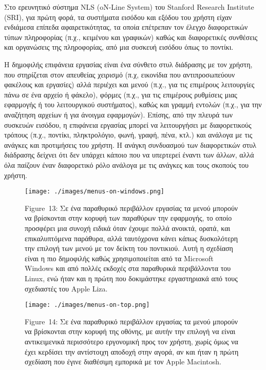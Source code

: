 \documentclass[
]{article}
\begin{document}
Στο ερευνητικό σύστημα NLS (oN-Line System) του Stanford Research
Institute (SRI), για πρώτη φορά, τα συστήματα εισόδου και εξόδου του
χρήστη είχαν ενδιάμεσα επίπεδα αφαιρετικότητας, τα οποία επέτρεπαν τον
έλεγχο διαφορετικών τύπων πληροφορίας (π.χ., κειμένου και γραφικών)
καθώς και διαφορετικές συνθέσεις και οργανώσεις της πληροφορίας, από μια
συσκευή εισόδου όπως το ποντίκι.

Η δημοφιλής επιφάνεια εργασίας είναι ένα σύνθετο στυλ διάδρασης με τον
χρήστη, που στηρίζεται στον απευθείας χειρισμό (π.χ, εικονίδια που
αντιπροσωπεύουν φακέλους και εργασίες) αλλά περιέχει και μενού (π.χ.,
για τις επιμέρους λειτουργίες πάνω σε ένα αρχείο ή φάκελο), φόρμες
(π.χ., για τις επιμέρους ρυθμίσεις μιας εφαρμογής ή του λειτουργικού
συστήματος), καθώς και γραμμή εντολών (π.χ., για την αναζήτηση αρχείων ή
για άνοιγμα εφαρμογών). Επίσης, από την πλευρά των συσκευών εισόδου, η
επιφάνεια εργασίας μπορεί να λειτουργήσει με διαφορετικούς τρόπους
(π.χ., ποντίκι, πληκτρολόγιο, φωνή, γραφή, πένα, κτλ.) και ανάλογα με
τις ανάγκες και προτιμήσεις του χρήστη. Η ανάγκη συνδυασμού των
διαφορετικών στυλ διάδρασης δείχνει ότι δεν υπάρχει κάποιο που να
υπερτερεί έναντι των άλλων, αλλά όλα παίζουν έναν διαφορετικό ρόλο
ανάλογα με τις ανάγκες και τους σκοπούς του χρήστη.

\leavevmode{}%
\begin{figure}
\hypertarget{fig:menus-on-windows}{%
\centering
\texttt{[image: ./images/menus-on-windows.png]}
\caption{Figure~13: Σε ένα παραθυρικό περιβάλλον εργασίας τα μενού
μπορούν να βρίσκονται στην κορυφή των παραθύρων την εφαρμογής, το οποίο
προσφέρει μια συνοχή ειδικά όταν έχουμε πολλά ανοικτά, ορατά, και
επικαλυπτόμενα παράθυρα, αλλά ταυτόχρονα κάνει κάπως δυσκολότερη την
επιλογή των μενού με τον δείκτη του ποντικιού. Αυτή η σχεδίαση είναι η
πιο δημοφιλής καθώς χρησιμοποιείται από τα Microsoft Windows και από
πολλές εκδοχές στα παραθυρικά περιβάλλοντα του Linux, ενώ ήταν και η
πρώτη που δοκιμάστηκε εργαστηριακά από τους σχεδιαστές του Apple
Liza.}\label{fig:menus-on-windows}
}
\end{figure}

\leavevmode{}%
\begin{figure}
\hypertarget{fig:menus-on-top}{%
\centering
\texttt{[image: ./images/menus-on-top.png]}
\caption{Figure~14: Σε ένα παραθυρικό περιβάλλον εργασίας τα μενού
μπορούν να βρίσκονται στην κορυφή της οθόνης, με αυτήν την επιλογή να
είναι αντικειμενικά περισσότερο εργονομική προς τον χρήστη, χωρίς όμως
να έχει κερδίσει την αντίστοιχη αποδοχή στην αγορά, αν και ήταν η πρώτη
σχεδίαση που έγινε διαθέσιμη εμπορικά με τον Apple
Macintosh.}\label{fig:menus-on-top}
}
\end{figure}
\end{document}
